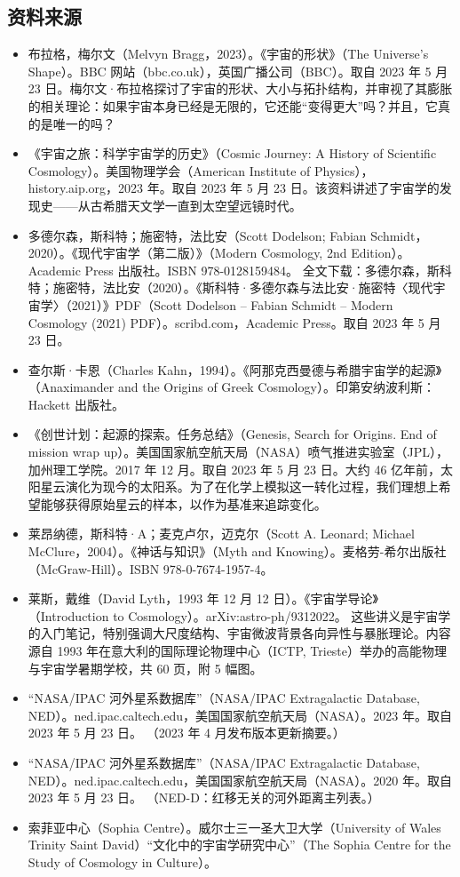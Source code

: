 \subsection{资料来源}
\begin{itemize}
\item 布拉格，梅尔文（Melvyn Bragg，2023）。《宇宙的形状》（The Universe’s Shape）。BBC 网站（bbc.co.uk），英国广播公司（BBC）。取自 2023 年 5 月 23 日。梅尔文·布拉格探讨了宇宙的形状、大小与拓扑结构，并审视了其膨胀的相关理论：如果宇宙本身已经是无限的，它还能“变得更大”吗？并且，它真的是唯一的吗？  
\item 《宇宙之旅：科学宇宙学的历史》（Cosmic Journey: A History of Scientific Cosmology）。美国物理学会（American Institute of Physics），history.aip.org，2023 年。取自 2023 年 5 月 23 日。该资料讲述了宇宙学的发现史——从古希腊天文学一直到太空望远镜时代。  
\item 多德尔森，斯科特；施密特，法比安（Scott Dodelson; Fabian Schmidt，2020）。《现代宇宙学（第二版）》（Modern Cosmology, 2nd Edition）。Academic Press 出版社。ISBN 978-0128159484。  
全文下载：多德尔森，斯科特；施密特，法比安（2020）。《斯科特·多德尔森与法比安·施密特〈现代宇宙学〉（2021）》PDF（Scott Dodelson – Fabian Schmidt – Modern Cosmology (2021) PDF）。scribd.com，Academic Press。取自 2023 年 5 月 23 日。  
\item 查尔斯·卡恩（Charles Kahn，1994）。《阿那克西曼德与希腊宇宙学的起源》（Anaximander and the Origins of Greek Cosmology）。印第安纳波利斯：Hackett 出版社。  
\item 《创世计划：起源的探索。任务总结》（Genesis, Search for Origins. End of mission wrap up）。美国国家航空航天局（NASA）喷气推进实验室（JPL），加州理工学院。2017 年 12 月。取自 2023 年 5 月 23 日。大约 46 亿年前，太阳星云演化为现今的太阳系。为了在化学上模拟这一转化过程，我们理想上希望能够获得原始星云的样本，以作为基准来追踪变化。  
\item 莱昂纳德，斯科特·A；麦克卢尔，迈克尔（Scott A. Leonard; Michael McClure，2004）。《神话与知识》（Myth and Knowing）。麦格劳-希尔出版社（McGraw-Hill）。ISBN 978-0-7674-1957-4。  
\item 莱斯，戴维（David Lyth，1993 年 12 月 12 日）。《宇宙学导论》（Introduction to Cosmology）。arXiv:astro-ph/9312022。  
这些讲义是宇宙学的入门笔记，特别强调大尺度结构、宇宙微波背景各向异性与暴胀理论。内容源自 1993 年在意大利的国际理论物理中心（ICTP, Trieste）举办的高能物理与宇宙学暑期学校，共 60 页，附 5 幅图。  
\item “NASA/IPAC 河外星系数据库”（NASA/IPAC Extragalactic Database, NED）。ned.ipac.caltech.edu，美国国家航空航天局（NASA）。2023 年。取自 2023 年 5 月 23 日。  
（2023 年 4 月发布版本更新摘要。）  
\item “NASA/IPAC 河外星系数据库”（NASA/IPAC Extragalactic Database, NED）。ned.ipac.caltech.edu，美国国家航空航天局（NASA）。2020 年。取自 2023 年 5 月 23 日。  
（NED-D：红移无关的河外距离主列表。）  
\item 索菲亚中心（Sophia Centre）。威尔士三一圣大卫大学（University of Wales Trinity Saint David）“文化中的宇宙学研究中心”（The Sophia Centre for the Study of Cosmology in Culture）。  
\end{itemize}
